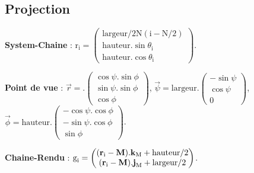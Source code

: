\subsection{Projection}
\begin{description}[leftmargin=0.1cm, itemsep=5pt]
\item{\bf System-Chaine} : r$_\text{i} = 
	\begin{pmatrix}
		\text{largeur} / 2 \text{N} ( \text{i} - \text{N} / 2 ) \\
		\text{hauteur}. \sin \theta _\text{i} \\
		\text{hauteur}. \cos \theta _\text{i}
	\end{pmatrix}$.
\item{\bf Point de vue} : 
	$\overrightarrow{r}  = \text{} .
	\begin{pmatrix}
		\cos \psi . \sin \phi \\
		\sin \psi . \sin \phi \\
		\cos \phi
	\end{pmatrix}$,
	$\overrightarrow{\psi} = \text{largeur} .
	\begin{pmatrix}
		- \sin \psi \\
		\cos \psi \\
		0
	\end{pmatrix}$,
	$\overrightarrow{\phi} = \text{hauteur} .
	\begin{pmatrix}
		- \cos \psi . \cos \phi \\
		- \sin \psi . \cos \phi \\
		\sin \phi
	\end{pmatrix}$.
\item{\bf Chaine-Rendu} : $\text{g}_\text{i} = 
	\begin{pmatrix}
	(\text{\bf r}_\text{i} - \text{\bf M}).{\text{\bf k}}_\text{M} + \text{hauteur} / 2 \\
	(\text{\bf r}_\text{i} - \text{\bf M}).{\text{\bf j}}_\text{M} + \text{largeur} / 2
	\end{pmatrix}$.
\end{description}
